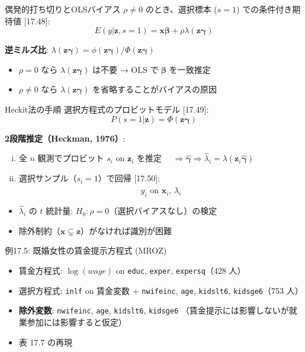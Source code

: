 \documentclass[
  ignorenonframetext,
]{beamer}
\providecommand{\tightlist}{%
  \setlength{\itemsep}{0pt}\setlength{\parskip}{0pt}}
\begin{document}
\begin{frame}{偶発的打ち切りとOLSバイアス}
\protect\hypertarget{ux5076ux767aux7684ux6253ux3061ux5207ux308aux3068olsux30d0ux30a4ux30a2ux30b9}{}
\(\rho \neq 0\) のとき、選択標本 (\(s = 1\)) での条件付き期待値
{[}17.48{]}:
\[E(y|\mathbf{z}, s=1) = \mathbf{x\beta} + \rho\lambda(\mathbf{z\gamma})\]

\textbf{逆ミルズ比}:
\(\lambda(\mathbf{z\gamma}) = \phi(\mathbf{z\gamma})/\Phi(\mathbf{z\gamma})\)

\begin{itemize}
\tightlist
\item
  \(\rho = 0\) なら \(\lambda(\mathbf{z\gamma})\) は不要 → OLS で
  \(\boldsymbol{\beta}\) を一致推定
\item
  \(\rho \neq 0\) なら \(\lambda(\mathbf{z\gamma})\)
  を省略することがバイアスの原因
\end{itemize}
\end{frame}

\begin{frame}{Heckit法の手順}
\protect\hypertarget{heckitux6cd5ux306eux624bux9806}{}
選択方程式のプロビットモデル {[}17.49{]}:
\[P(s=1|\mathbf{z}) = \Phi(\mathbf{z\gamma})\]

\textbf{2段階推定（Heckman, 1976）}:

\begin{enumerate}
[(i)]
\item
  全 \(n\) 観測でプロビット \(s_i\) on \(\mathbf{z}_i\) を推定
  \(\quad\Rightarrow\hat{\boldsymbol{\gamma}} \Rightarrow \hat{\lambda}_i = \lambda(\mathbf{z}_i\hat{\boldsymbol{\gamma}})\)
\item
  選択サンプル（\(s_i = 1\)）で回帰 {[}17.50{]}:
  \[y_i \text{ on } \mathbf{x}_i,\, \hat{\lambda}_i\]
\end{enumerate}

\begin{itemize}
\tightlist
\item
  \(\hat{\lambda}_i\) の \(t\) 統計量:
  \(H_0: \rho = 0\)（選択バイアスなし）の検定
\item
  除外制約（\(\mathbf{x} \subsetneq \mathbf{z}\)）がなければ識別が困難
\end{itemize}
\end{frame}

\begin{frame}[fragile]{例17.5: 既婚女性の賃金提示方程式 (MROZ)}
\protect\hypertarget{ux4f8b17.5-ux65e2ux5a5aux5973ux6027ux306eux8cc3ux91d1ux63d0ux793aux65b9ux7a0bux5f0f-mroz}{}
\begin{itemize}
\tightlist
\item
  賃金方程式: \(\log(wage)\) on \texttt{educ}, \texttt{exper},
  \texttt{expersq}（428 人）
\item
  選択方程式: \texttt{inlf} on 賃金変数 + \texttt{nwifeinc},
  \texttt{age}, \texttt{kidslt6}, \texttt{kidsge6}（753 人）
\item
  \textbf{除外変数}: \texttt{nwifeinc}, \texttt{age}, \texttt{kidslt6},
  \texttt{kidsge6}
  （賃金提示には影響しないが就業参加には影響すると仮定）
\item
  表 17.7 の再現
\end{itemize}
\end{frame}
\end{document}
